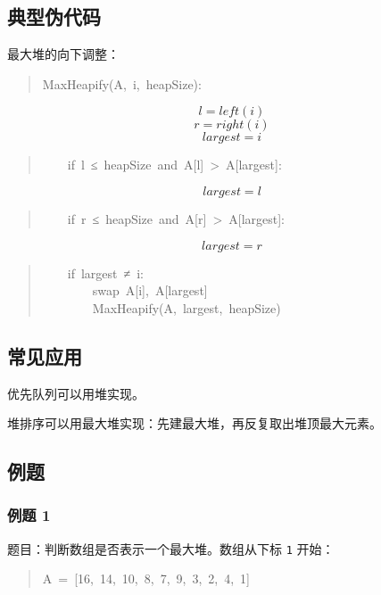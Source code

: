 \documentclass[UTF8,zihao=-4]{ctexart}
\begin{document}
\subsection*{典型伪代码}

最大堆的向下调整：

\begin{quote}
\small\ttfamily\raggedright
\relax MaxHeapify(A,\ i,\ heapSize):\\
\end{quote}
\[l = left(i)\]
\[r = right(i)\]
\[largest = i\]
\begin{quote}
\small\ttfamily\raggedright
\relax \ \ \ \ if\ l\ ≤\ heapSize\ and\ A[l]\ >\ A[largest]:\\
\end{quote}
\[largest = l\]
\begin{quote}
\small\ttfamily\raggedright
\relax \ \ \ \ if\ r\ ≤\ heapSize\ and\ A[r]\ >\ A[largest]:\\
\end{quote}
\[largest = r\]
\begin{quote}
\small\ttfamily\raggedright
\relax \ \ \ \ if\ largest\ ≠\ i:\\
\relax \ \ \ \ \ \ \ \ swap\ A[i],\ A[largest]\\
\relax \ \ \ \ \ \ \ \ MaxHeapify(A,\ largest,\ heapSize)\\
\end{quote}

\subsection*{常见应用}

优先队列可以用堆实现。

堆排序可以用最大堆实现：先建最大堆，再反复取出堆顶最大元素。

\subsection*{例题}

\subsubsection*{例题 1}

题目：判断数组是否表示一个最大堆。数组从下标 \texttt{1} 开始：

\begin{quote}
\small\ttfamily\raggedright
\relax A\ =\ [16,\ 14,\ 10,\ 8,\ 7,\ 9,\ 3,\ 2,\ 4,\ 1]\\
\end{quote}
\end{document}
